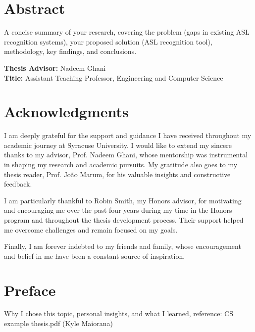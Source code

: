 \documentclass[12pt]{article}
\begin{document}
\clearpage
\section*{Abstract}
\vspace{1em}

\noindent
A concise summary of your research, covering the problem (gaps in existing ASL recognition 
systems), your proposed solution (ASL recognition tool), methodology, key findings, and
conclusions. 

\vspace{2em}
\noindent
\textbf{Thesis Advisor:} Nadeem Ghani \\
\textbf{Title:} Assistant Teaching Professor, Engineering and Computer Science

\newpage
\doublespacing
\section*{Acknowledgments}

I am deeply grateful for the support and guidance I have received throughout my academic journey at Syracuse University. I would like to extend my sincere thanks to my advisor, Prof. Nadeem Ghani, whose mentorship was instrumental in shaping my research and academic pursuits. My gratitude also goes to my thesis reader, Prof. João Marum, for his valuable insights and constructive feedback.

I am particularly thankful to Robin Smith, my Honors advisor, for motivating and encouraging me over the past four years during my time in the Honors program and throughout the thesis development process. Their support helped me overcome challenges and remain focused on my goals.

Finally, I am forever indebted to my friends and family, whose encouragement and belief in me have been a constant source of inspiration.


\newpage
\doublespacing
\section*{Preface}

Why I chose this topic, personal insights, and what I learned, reference: CS example 
thesis.pdf (Kyle Maiorana)
\end{document}
